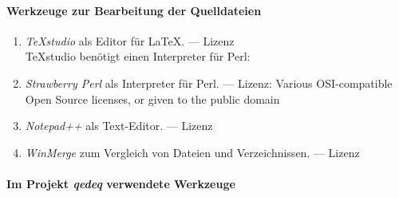 \paragraph{Werkzeuge zur Bearbeitung der Quelldateien}%

\begin{enumerate}
	\setcounter{enumi}{\value{Enumi}}%

	\item\label{Werkzeug:TeXstudio}\emph{\TeX studio} als Editor für \LaTeX.
	--- Lizenz \\
	\TeX studio benötigt einen Interpreter für Perl:

	\item\label{Werkzeug:Perl}\emph{Strawberry Perl} als Interpreter für Perl.
	--- Lizenz: Various OSI-compatible Open Source licenses, or given to the public domain

	\item\label{Werkzeug:Notepadpp}\emph{Notepad++} als Text-Editor.
	--- Lizenz 

	\item\label{Werkzeug:WinMerge}\emph{WinMerge} zum Vergleich von Dateien und Verzeichnissen.
	--- Lizenz 

	\setcounter{Enumi}{\value{enumi}}%
\end{enumerate}

\color{gray}%
\paragraph{Im Projekt \emph{qedeq} verwendete Werkzeuge}%

